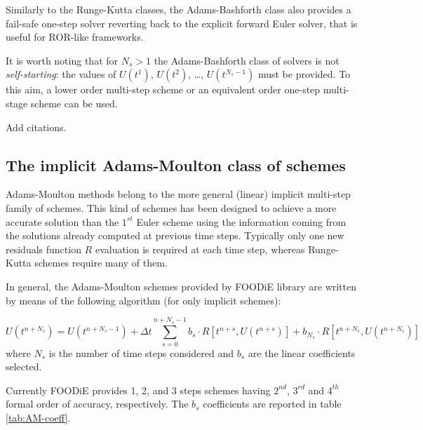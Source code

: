\documentclass[pdftex,preprint,3p,times,numbers]{elsarticle}
\begin{document}
Similarly to the Runge-Kutta classes, the Adams-Bashforth class also provides a fail-safe one-step solver reverting back to the explicit forward Euler solver, that is useful for ROR-like frameworks.

It is worth noting that for $N_s>1$ the Adams-Bashforth class of solvers is not \emph{self-starting}: the values of $U\left(t^{1}\right)$, $U\left(t^{2}\right)$, \dots, $U\left(t^{N_s-1}\right)$ must be provided. To this aim, a lower order multi-step scheme or an equivalent order one-step multi-stage scheme can be used.

{\color{red} Add citations.}

\subsection{The implicit Adams-Moulton class of schemes}

Adams-Moulton methods belong to the more general (linear) implicit multi-step family of schemes. This kind of schemes has been designed to achieve a more accurate solution than the $1^{st}$ Euler scheme using the information coming from the solutions already computed at previous time steps. Typically only one new residuals function $R$ evaluation is required at each time step, whereas Runge-Kutta schemes require many of them.

In general, the Adams-Moulton schemes provided by FOODiE library are written by means of the following algorithm (for only implicit schemes):

\begin{equation}
  U\left(t^{n+N_s}\right) = U\left(t^{n+N_s-1}\right) +\Delta t \sum_{s=0}^{n+N_s-1}{ b_s \cdot R\left[t^{n+s}, U\left(t^{n+s}\right)\right]} + b_{N_s}\cdot R\left[t^{n+N_s}, U\left(t^{n+N_s}\right)\right]
\label{eq:AM}
\end{equation}
where $N_s$ is the number of time steps considered and $b_s$ are the linear coefficients selected.

Currently FOODiE provides 1, 2, and 3 steps schemes having $2^{nd}$, $3^{rd}$ and $4^{th}$ formal order of accuracy, respectively. The $b_s$ coefficients are reported in table \ref{tab:AM-coeff}.

\begin{table}[!ht]
  \centering
  \caption{Implicit Adams-Moulton coefficients\label{tab:AM-coeff}}
\end{table}
\end{document}
